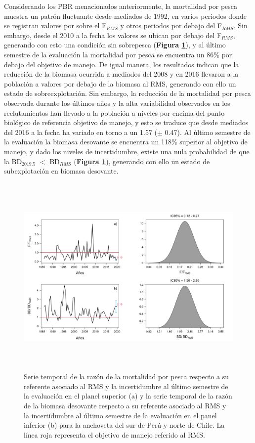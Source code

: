 \documentclass[letter,11pt]{article}
\begin{document}
Considerando los PBR menacionados anteriormente, la mortalidad por pesca muestra un
patr\'on fluctuante desde mediados de 1992, en varios periodos donde se registran
valores por sobre el F$_{RMS}$ y otros periodos por debajo del
F$_{RMS}$. Sin embargo, desde el 2010 a la fecha los valores se ubican
por debajo del F$_{RMS}$, generando con esto una condici\'on sin
sobrepesca (\textbf{Figura \ref{Fig09}}), y al \'ultimo semestre de la
evaluaci\'on la mortalidad por pesca se encuentra un 86\% por debajo del
objetivo de manejo. De igual manera, los resultados indican que la
reducci\'on de la biomasa ocurrida a mediados del 2008 y en 2016 llevaron
a la poblaci\'on a valores por debajo de la biomasa al RMS, generando con
ello un estado de sobreexplotaci\'on. Sin embargo, la reducci\'on de la
mortalidad por pesca observada durante los \'ultimos a\~{n}os y la alta
variabilidad observados en los reclutamientos han llevado a la poblaci\'on
a niveles por encima del punto biol\'ogico de referencia objetivo de manejo,
y esto se traduce que desde mediados del 2016 a la fecha ha variado en torno a
un 1.57 ($\pm$ 0.47). Al \'ultimo semestre de la evaluaci\'on la biomasa
desovante se encuentra un 118\% superior al objetivo de manejo, y dado
los niveles de incertidumbre, existe una nula probabilidad de que la
BD$_{2019.5}$ $<$ BD$_{RMS}$ (\textbf{Figura \ref{Fig09}}),
generando con ello un estado de subexplotaci\'on en biomasa desovante.\\


\vspace{0.5cm}
\begin{figure}[htb!]
 \centering
 \includegraphics[width=15cm,height=10cm]{fig/figura09.pdf}
 \caption{Serie temporal de la raz\'on de la mortalidad por pesca respecto a su referente asociado al RMS y la incertidumbre al \'ultimo semestre de la evaluaci\'on en el planel superior (a) y la serie temporal de la raz\'on de la biomasa desovante respecto a su referente asociado al RMS y la incertidumbre al \'ultimo semestre de la evaluaci\'on en el panel inferior (b) para la anchoveta del sur de Per\'u y norte de Chile. La l\'inea roja representa el objetivo de manejo referido al RMS.}
 \label{Fig09}
\end{figure}
\vspace{0.5cm}
\end{document}
